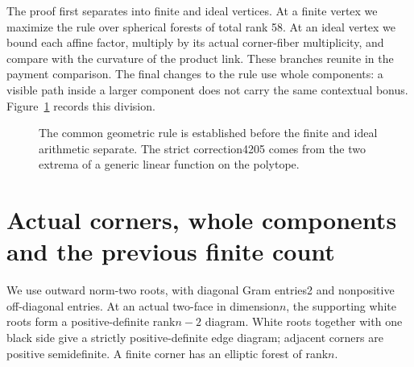 \documentclass[11pt]{article}
\theoremstyle{remark}\newtheorem{remark}[theorem]{Remark}
\begin{document}
The proof first separates into finite and ideal vertices. At a finite
vertex we maximize the rule over spherical forests of total rank 58.
At an ideal vertex we bound each affine factor, multiply by its
actual corner-fiber multiplicity, and compare with the curvature of
the product link. These branches reunite in the payment comparison.
The final changes to the rule use whole components: a visible path
inside a larger component does not carry the same contextual bonus.
Figure~\ref{fig:proof-branches} records this division.

\begin{figure}[t]
\centering
{}
\caption{The common geometric rule is established before the finite
and ideal arithmetic separate. The strict correction4205 comes from
the two extrema of a generic linear function on the polytope.}
\label{fig:proof-branches}
\end{figure}

\section{Actual corners, whole components and the previous finite count}
\label{sec:finite-interface}
We use outward norm-two roots, with diagonal Gram entries2 and
nonpositive off-diagonal entries. At an actual two-face in dimension$n$,
the supporting white roots form a positive-definite rank$n-2$ diagram.
White roots together with one black side give a strictly positive-definite
edge diagram; adjacent corners are positive semidefinite. A finite corner
has an elliptic forest of rank$n$.
\end{document}
